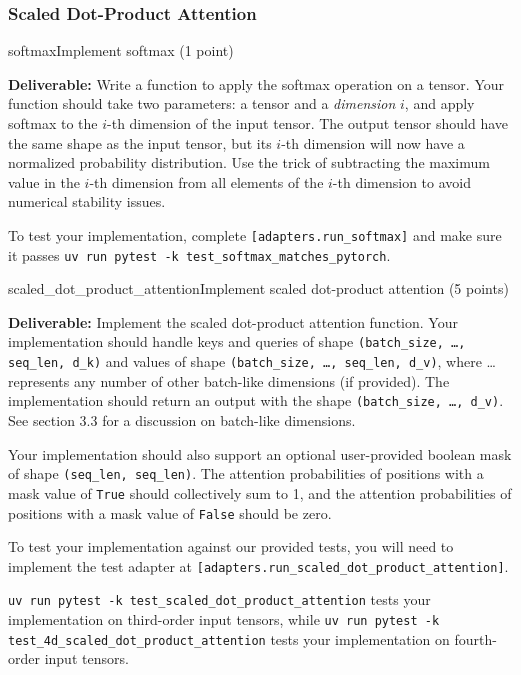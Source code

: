 \subsubsection{Scaled Dot-Product Attention}

\begin{problembox}{softmax}{Implement softmax \hfill (1 point)}

    \textbf{Deliverable:} Write a function to apply the softmax operation on a tensor. Your function should take two parameters: a tensor and a \textit{dimension} $i$, and apply softmax to the $i$-th dimension of the input tensor. The output tensor should have the same shape as the input tensor, but its $i$-th dimension will now have a normalized probability distribution. Use the trick of subtracting the maximum value in the $i$-th dimension from all elements of the $i$-th dimension to avoid numerical stability issues.

    To test your implementation, complete \textcolor{red!80!black}{\texttt{[adapters.run\_softmax]}} and make sure it passes \texttt{uv run pytest -k test\_softmax\_matches\_pytorch}.

\end{problembox}

\boxseparator

\begin{problembox}{scaled\_dot\_product\_attention}{Implement scaled dot-product attention \hfill (5 points)}

    \textbf{Deliverable:} \quad Implement the scaled dot-product attention function. Your implementation should handle keys and queries of shape \texttt{(batch\_size, \dots, seq\_len, d\_k)} and values of shape \texttt{(batch\_size, \dots, seq\_len, d\_v)}, where \dots represents any number of other batch-like dimensions (if provided). The implementation should return an output with the shape \texttt{(batch\_size, \dots, d\_v)}. See section 3.3 for a discussion on batch-like dimensions.

    Your implementation should also support an optional user-provided boolean mask of shape \texttt{(seq\_len, seq\_len)}. The attention probabilities of positions with a mask value of \texttt{True} should collectively sum to 1, and the attention probabilities of positions with a mask value of \texttt{False} should be zero.

    To test your implementation against our provided tests, you will need to implement the test adapter at \textcolor{red!80!black}{\texttt{[adapters.run\_scaled\_dot\_product\_attention]}}.

    \texttt{uv run pytest -k test\_scaled\_dot\_product\_attention} tests your implementation on third-order input tensors, while \texttt{uv run pytest -k test\_4d\_scaled\_dot\_product\_attention} tests your implementation on fourth-order input tensors.

\end{problembox}

